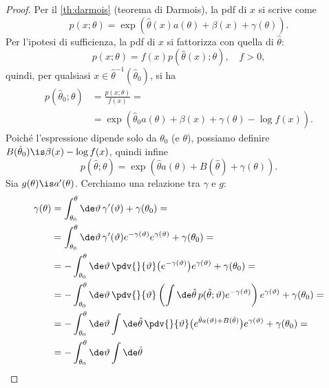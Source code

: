 \begin{proof}
	Per il \autoref{th:darmois} (teorema di Darmois),
	la pdf di $x$ si scrive come
	\begin{equation*}
		p(x;\theta)
		= \exp \left( \hat\theta(x)a(\theta) + \beta(x) + \gamma(\theta) \right).
	\end{equation*}
	Per l'ipotesi di sufficienza, la pdf di $x$ si fattorizza con quella di $\hat\theta$:
	\begin{equation*}
		p(x;\theta)
		= f(x) p(\hat\theta(x);\theta), \quad f > 0,
	\end{equation*}
	quindi, per qualsiasi $x\in\hat\theta^{-1}(\hat\theta_0)$, si ha
	\begin{align*}
		p(\hat\theta_0;\theta)
		&= \frac{p(x;\theta)}{f(x)} = \\
		&= \exp \left( \hat\theta_0 a(\theta) + \beta(x) + \gamma(\theta) - \log f(x) \right).
	\end{align*}
	Poiché l'espressione dipende solo da $\theta_0$ (e $\theta$),
	possiamo definire $B(\hat\theta_0)\is\beta(x)-\log f(x)$,
	quindi infine
	\begin{equation*}
		p(\hat\theta;\theta)
		= \exp \left( \hat\theta a(\theta) + B(\hat\theta) + \gamma(\theta) \right).
	\end{equation*}
	Sia $g(\theta)\is a'(\theta)$.
	Cerchiamo una relazione tra $\gamma$ e $g$:
	\begin{align*}
		\gamma(\theta)
		&= \int_{\theta_0}^\theta \de\vartheta\, \gamma'(\vartheta) + \gamma(\theta_0) = \\
		&= \int_{\theta_0}^\theta \de\vartheta\,
		\gamma'(\vartheta) e^{-\gamma(\vartheta)} e^{\gamma(\vartheta)}
		+ \gamma(\theta_0) = \\
		&= - \int_{\theta_0}^\theta \de\vartheta\,
		\pdv{}{\vartheta}\big(e^{-\gamma(\vartheta)}\big) e^{\gamma(\vartheta)}
		+ \gamma(\theta_0) = \\
		&= - \int_{\theta_0}^\theta \de\vartheta\,
		\pdv{}{\vartheta} \left( \int\de\hat\theta\, p(\hat\theta;\vartheta) e^{-\gamma(\vartheta)} \right)
		e^{\gamma(\vartheta)} + \gamma(\theta_0) = \\
		&= - \int_{\theta_0}^\theta \de\vartheta \int\de\hat\theta\,
		\pdv{}{\vartheta} \big( e^{\hat\theta a(\vartheta) + B(\hat\theta)} \big) e^{\gamma(\vartheta)}
		+ \gamma(\theta_0) = \\
		&= - \int_{\theta_0}^\theta \de\vartheta \int\de\hat\theta\,

\end{align*}
\end{proof}

